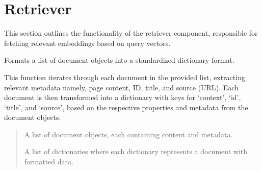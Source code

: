 \documentclass[letterpaper,10pt,english,openany,oneside]{sphinxmanual}
\begin{document}
\sphinxstepscope


\chapter{Retriever}
\label{\detokenize{retriever:retriever}}\label{\detokenize{retriever::doc}}
\sphinxAtStartPar
This section outlines the functionality of the retriever component, responsible for fetching relevant embeddings based on query vectors.
\label{\detokenize{retriever:module-tools.pipeline}}

\begin{fulllineitems}
\label{\detokenize{retriever:tools.pipeline.format_documents}}
\pysigstartsignatures
{}
\pysigstopsignatures
\sphinxAtStartPar
Formats a list of document objects into a standardized dictionary format.

\sphinxAtStartPar
This function iterates through each document in the provided list, extracting relevant metadata namely, page content, ID, title, and source (URL).
Each document is then transformed into a dictionary with keys for ‘context’, ‘id’, ‘title’, and ‘source’, based on the respective properties and metadata from the document objects.
\begin{quote}\begin{description}
\sphinxAtStartPar
{} \textendash{} A list of document objects, each containing content and metadata.

\sphinxAtStartPar
A list of dictionaries where each dictionary represents a document with formatted data.

\end{description}\end{quote}

\end{fulllineitems}
\end{document}
